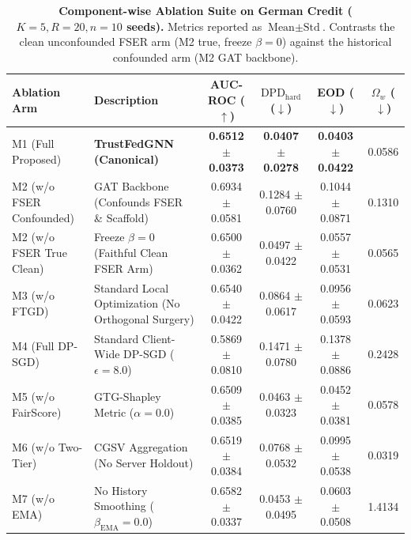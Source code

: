 \begin{table}[t]
\centering
\small
\caption{\textbf{Component-wise Ablation Suite on German Credit ($K=5, R=20, n=10$ seeds).} Metrics reported as $\text{Mean} \pm \text{Std}$. Contrasts the clean unconfounded FSER arm (M2 true, freeze $\beta=0$) against the historical confounded arm (M2 GAT backbone).}
\label{tab:ablation}
\label{tab:ablation_suite}
\begin{tabular}{llcccc}
\toprule
\textbf{Ablation Arm} & \textbf{Description} & \textbf{AUC-ROC} ($\uparrow$) & \textbf{$\text{DPD}_{\text{hard}}$} ($\downarrow$) & \textbf{EOD} ($\downarrow$) & \textbf{$\Omega_w$} ($\downarrow$) \\
\midrule
M1 (Full Proposed) & \textbf{TrustFedGNN (Canonical)} & \textbf{0.6512 $\pm$ 0.0373} & \textbf{0.0407 $\pm$ 0.0278} & \textbf{0.0403 $\pm$ 0.0422} & 0.0586 \\
M2 (w/o FSER Confounded) & GAT Backbone (Confounds FSER \& Scaffold) & 0.6934 $\pm$ 0.0581 & 0.1284 $\pm$ 0.0760 & 0.1044 $\pm$ 0.0871 & 0.1310 \\
M2 (w/o FSER True Clean) & Freeze $\beta=0$ (Faithful Clean FSER Arm) & 0.6500 $\pm$ 0.0362 & 0.0497 $\pm$ 0.0422 & 0.0557 $\pm$ 0.0531 & 0.0565 \\
M3 (w/o FTGD) & Standard Local Optimization (No Orthogonal Surgery) & 0.6540 $\pm$ 0.0422 & 0.0864 $\pm$ 0.0617 & 0.0956 $\pm$ 0.0593 & 0.0623 \\
M4 (Full DP-SGD) & Standard Client-Wide DP-SGD ($\epsilon=8.0$) & 0.5869 $\pm$ 0.0810 & 0.1471 $\pm$ 0.0780 & 0.1378 $\pm$ 0.0886 & 0.2428 \\
M5 (w/o FairScore) & GTG-Shapley Metric ($\alpha=0.0$) & 0.6509 $\pm$ 0.0385 & 0.0463 $\pm$ 0.0323 & 0.0452 $\pm$ 0.0381 & 0.0578 \\
M6 (w/o Two-Tier) & CGSV Aggregation (No Server Holdout) & 0.6519 $\pm$ 0.0384 & 0.0768 $\pm$ 0.0532 & 0.0995 $\pm$ 0.0538 & 0.0319 \\
M7 (w/o EMA) & No History Smoothing ($\beta_{\text{EMA}}=0.0$) & 0.6582 $\pm$ 0.0337 & 0.0453 $\pm$ 0.0495 & 0.0603 $\pm$ 0.0508 & 1.4134 \\
\bottomrule
\end{tabular}
\end{table}
